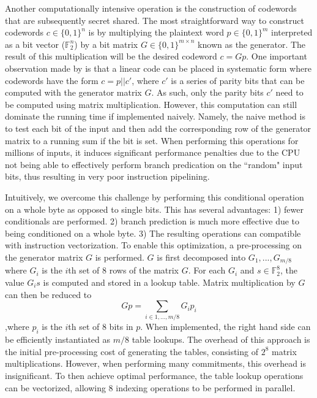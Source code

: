 Another computationally intensive operation is the construction of codewords that are subsequently secret shared. The most straightforward way to construct codewords $c\in\{0,1\}^n$ is by multiplying the plaintext word $p\in\{0,1\}^m$ interpreted as a bit vector ($\mathbb{F}_2^n$) by a bit matrix $G\in\{0,1\}^{m\times n}$ known as the generator. The result of this multiplication will be the desired codeword $c=Gp$. One important observation made by \cite{DBLP:conf/tcc/FrederiksenJNT16} is that a linear code can be placed in systematic form where codewords have the form $c=p||c'$, where $c'$ is a series of parity bits that can be computed with the generator matrix $G$. As such, only the parity bits $c'$ need to be computed using matrix multiplication. However, this computation can still dominate the running time if implemented naively. Namely, the naive method is to test each bit of the input and then add the corresponding row of the generator matrix to a running sum if the bit is set. When performing this operations for millions of inputs, it induces significant performance penalties due to the CPU not being able to effectively perform branch predication on the ``random" input bits, thus resulting in very poor instruction pipelining. 

Intuitively, we overcome this challenge by performing this conditional operation on a whole byte as opposed to single bits. This has several advantages: 1) fewer conditionals are performed. 2) branch prediction is much more effective due to being conditioned on a whole byte.  3) The resulting operations can compatible with instruction vectorization. To enable this optimization, a pre-processing on the generator matrix $G$ is performed. $G$ is first decomposed into $G_1,...,G_{m/8}$ where $G_i$ is the $i$th set of 8 rows of the matrix $G$. For each $G_i$ and $s\in\mathbb{F}_2^8$, the value $G_is$ is computed and stored in a lookup table. Matrix multiplication by $G$ can then be reduced to
\[
   Gp = \sum_{i\in {1,...,m/8}} G_ip_i
\] 
,where $p_i$ is the $i$th set of 8 bits in $p$. When implemented, the right hand side can be efficiently instantiated as $m/8$ table lookups. The overhead of this approach is the initial pre-processing cost of generating the tables, consisting of $2^8$ matrix multiplications. However, when performing many commitments, this overhead is insignificant. To then achieve optimal performance, the table lookup operations can be vectorized, allowing 8 indexing operations to be performed in parallel. 

